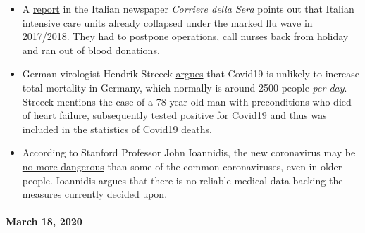 \begin{itemize}
\tightlist
\item
  A
  \href{https://milano.corriere.it/notizie/cronaca/18_gennaio_10/milano-terapie-intensive-collasso-l-influenza-gia-48-malati-gravi-molte-operazioni-rinviate-c9dc43a6-f5d1-11e7-9b06-fe054c3be5b2.shtml}{report}
  in the Italian newspaper \emph{Corriere della Sera} points out that
  Italian intensive care units already collapsed under the marked flu
  wave in 2017/2018. They had to postpone operations, call nurses back
  from holiday and ran out of blood donations.
\item
  German virologist Hendrik Streeck
  \href{https://www.faz.net/aktuell/gesellschaft/gesundheit/coronavirus/virologe-hendrik-streeck-ueber-corona-neue-symptome-entdeckt-16681450.html?printPagedArticle=true\#pageIndex_2}{argues}
  that Covid19 is unlikely to increase total mortality in Germany, which
  normally is around 2500 people \emph{per day}. Streeck mentions the
  case of a 78-year-old man with preconditions who died of heart
  failure, subsequently tested positive for Covid19 and thus was
  included in the statistics of Covid19 deaths.
\item
  According to Stanford Professor John Ioannidis, the new coronavirus
  may be
  \href{https://www.statnews.com/2020/03/17/a-fiasco-in-the-making-as-the-coronavirus-pandemic-takes-hold-we-are-making-decisions-without-reliable-data/}{no
  more dangerous} than some of the common coronaviruses, even in older
  people. Ioannidis argues that there is no reliable medical data
  backing the measures currently decided upon.
\end{itemize}

\hypertarget{march-18-2020}{%
\paragraph{March 18, 2020}\label{march-18-2020}}

